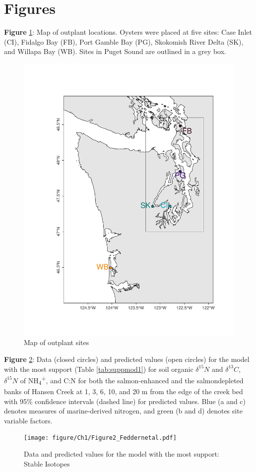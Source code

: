 \documentclass [11pt, proquest] {uwthesis}[2015/03/03]
\begin{document}
\hypertarget{figures}{%
\section{Figures}\label{figures}}

\textbf{Figure} \ref{fig:sitemap}: Map of outplant locations. Oysters were placed at five sites: Case Inlet (CI), Fidalgo Bay (FB), Port Gamble Bay (PG), Skokomish River Delta (SK), and Willapa Bay (WB). Sites in Puget Sound are outlined in a grey box.\newline
\begin{figure}[h]
  \includegraphics{figure/Ch1/fig1.1.pdf}
  \caption{Map of outplant sites}
  \label{fig:sitemap}
\end{figure}
\clearpage

\textbf{Figure} \ref{fig:modIsotope}: Data (closed circles) and predicted values (open circles) for the model with the most support (Table \ref{tab:suppmod1}) for soil organic \(\delta^{15}N\) and \(\delta^{13}C\), \(\delta^{15}N\) of NH\textsubscript{4}\textsuperscript{+}, and C:N for both the salmon-enhanced and the salmondepleted banks of Hansen Creek at 1, 3, 6, 10, and 20 m from the edge of the creek bed with 95\% confidence intervals (dashed line) for predicted values. Blue (a and c) denotes measures of marine-derived nitrogen, and green (b and d) denotes site variable factors.\newline
\begin{figure}[h]
  \texttt{[image: figure/Ch1/Figure2\_Feddernetal.pdf]}
  \caption{Data and predicted values for the model with the most support: Stable Isotopes}
  \label{fig:modIsotope}
\end{figure}
\clearpage
\end{document}

